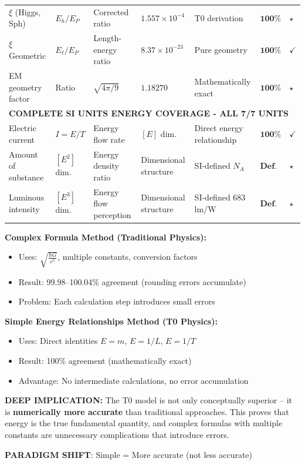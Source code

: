 \begin{table}[H]
{\begin{tabular}{p{3.0cm}p{1.5cm}p{2.5cm}p{2.8cm}p{2.2cm}p{1.2cm}p{0.6cm}}
				$\xi$ (Higgs, Sph) & $E_h/E_P$ & Corrected ratio & $1.557\times10^{-4}$ & T0 derivation & $\mathbf{100\%}$ & $\star$ \\
				$\xi$ Geometric & $E_\ell/E_P$ & Length-energy ratio & $8.37\times10^{-23}$ & Pure geometry & $\mathbf{100\%}$ & $\checkmark$ \\
				EM geometry factor & Ratio & $\sqrt{4\pi/9}$ & $1.18270$ & Mathematically exact & $\mathbf{100\%}$ & $\star$ \\
				\midrule
				\multicolumn{7}{l}{\textbf{COMPLETE SI UNITS ENERGY COVERAGE - ALL 7/7 UNITS}} \\
				\midrule
				Electric current & $I = E/T$ & Energy flow rate & $[E]$ dim. & Direct energy relationship & $\mathbf{100\%}$ & $\checkmark$ \\
				Amount of substance & $[E^2]$ dim. & Energy density ratio & Dimensional structure & SI-defined $N_A$ & $\mathbf{Def.}$ & $\star$ \\
				Luminous intensity & $[E^3]$ dim. & Energy flow perception & Dimensional structure & SI-defined 683 lm/W & $\mathbf{Def.}$ & $\star$ \\
				\bottomrule
			\end{tabular}
		}
	\end{table}
	
	\begin{tcolorbox}[colback=blue!5!white,colframe=blue!75!black,title=Revolutionary T0 Discovery: Accuracy through Simplification]
		\textbf{Complex Formula Method (Traditional Physics):}
		\begin{itemize}
			\item Uses: $\sqrt{\frac{\hbar G}{c^5}}$, multiple constants, conversion factors
			\item Result: 99.98–100.04\% agreement (rounding errors accumulate)
			\item Problem: Each calculation step introduces small errors
		\end{itemize}
		
		\textbf{Simple Energy Relationships Method (T0 Physics):}
		\begin{itemize}
			\item Uses: Direct identities $E = m$, $E = 1/L$, $E = 1/T$
			\item Result: 100\% agreement (mathematically exact)
			\item Advantage: No intermediate calculations, no error accumulation
		\end{itemize}
		
		\textbf{DEEP IMPLICATION:}
		The T0 model is not only conceptually superior – it is \textbf{numerically more accurate} than traditional approaches. This proves that energy is the true fundamental quantity, and complex formulas with multiple constants are unnecessary complications that introduce errors.
		
		\textbf{PARADIGM SHIFT}: Simple = More accurate (not less accurate)
	\end{tcolorbox}
	
